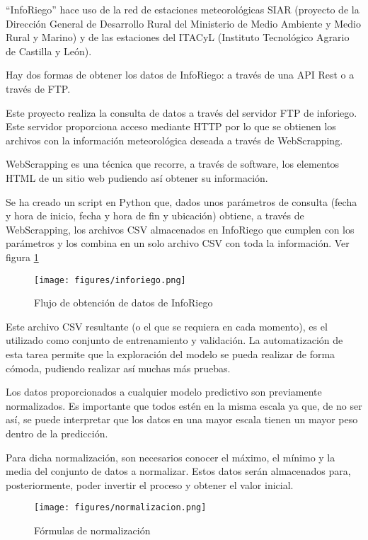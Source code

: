 ``InfoRiego'' hace uso de la red de estaciones meteorológicas SIAR (proyecto de la Dirección General de Desarrollo Rural del Ministerio de Medio Ambiente y Medio Rural y Marino) y de las estaciones del ITACyL (Instituto Tecnológico Agrario de Castilla y León).

Hay dos formas de obtener los datos de InfoRiego: a través de una API Rest o a través de FTP.

Este proyecto realiza la consulta de datos a través del servidor FTP de inforiego. Este servidor proporciona acceso mediante HTTP por lo que se obtienen los archivos con la información meteorológica deseada a través de WebScrapping.

WebScrapping es una técnica que recorre, a través de software, los elementos HTML de un sitio web pudiendo así obtener su información.

Se ha creado un script en Python que, dados unos parámetros de consulta (fecha y hora de inicio, fecha y hora de fin y ubicación) obtiene, a través de WebScrapping, los archivos CSV almacenados en InfoRiego que cumplen con los parámetros y los combina en un solo archivo CSV con toda la información. Ver figura \ref{inforiego}

\begin{figure}[htb]
	\begin{center}
		\texttt{[image: figures/inforiego.png]}
		\caption{Flujo de obtención de datos de InfoRiego \label{inforiego}}
	\end{center}
\end{figure}

Este archivo CSV resultante (o el que se requiera en cada momento), es el utilizado como conjunto de entrenamiento y validación. La automatización de esta tarea permite que la exploración del modelo se pueda realizar de forma cómoda, pudiendo realizar así muchas más pruebas.

Los datos proporcionados a cualquier modelo predictivo son previamente normalizados. Es importante que todos estén en la misma escala ya que, de no ser así, se puede interpretar que los datos en una mayor escala tienen un mayor peso dentro de la predicción.

Para dicha normalización, son necesarios conocer el máximo, el mínimo y la media del conjunto de datos a normalizar. Estos datos serán almacenados para, posteriormente, poder invertir el proceso y obtener el valor inicial.

\begin{figure}[htb]
	\begin{center}
		\texttt{[image: figures/normalizacion.png]}
		\caption{Fórmulas de normalización \label{normalizacion}}
	\end{center}
\end{figure}

